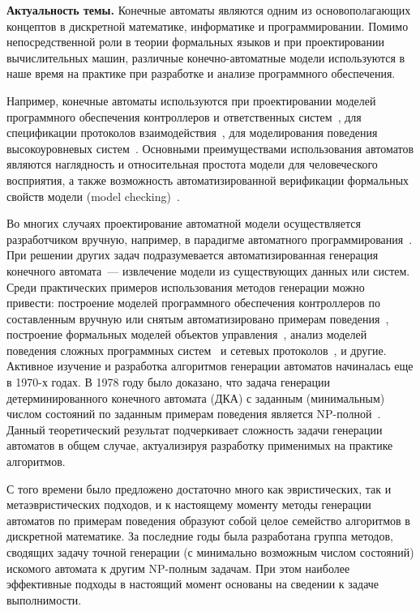 \textbf{Актуальность темы.} 
Конечные автоматы являются одним из основополагающих концептов в дискретной математике, информатике и программировании.
Помимо непосредственной роли в теории формальных языков и при проектировании вычислительных машин, различные конечно-автоматные модели используются в наше время на практике при разработке и анализе программного обеспечения.

Например, конечные автоматы используются при проектировании моделей программного обеспечения контроллеров и ответственных систем~\cite{shalyto-automata-2010,DBLP:conf/setta/PatilDV15}, для спецификации протоколов взаимодействия~\cite{DBLP:conf/coordination/JongmansHA14}, для моделирования поведения высокоуровневых систем~\cite{DBLP:journals/ese/HeuleV13,wagner2006modeling}.
Основными преимуществами использования автоматов являются наглядность и относительная простота модели для человеческого восприятия, а также возможность автоматизированной верификации формальных свойств модели (model checking)~\cite{clarke2018model}.

Во многих случаях проектирование автоматной модели осуществляется разработчиком вручную, например, в парадигме автоматного программирования~\cite{shalyto-automata-2010}.
При решении других задач подразумевается автоматизированная генерация конечного автомата~--- извлечение модели из существующих данных или систем.
Среди практических примеров использования методов генерации можно привести: построение моделей программного обеспечения контроллеров по составленным вручную или снятым автоматизировано примерам поведения~\cite{DBLP:conf/etfa/ChivilikhinBUSS18}, построение формальных моделей объектов управления~\cite{DBLP:conf/etfa/BuzhinskyV17,DBLP:journals/tii/BuzhinskyV17}, анализ моделей поведения сложных программных систем~\cite{DBLP:journals/tosem/CookW98,DBLP:conf/sigsoft/BertolinoIPT09,DBLP:journals/ese/HeuleV13} и сетевых протоколов~\cite{DBLP:conf/sp/SivakornAPKJ17}, и другие.
Активное изучение и разработка алгоритмов генерации автоматов начиналась еще в 1970-х годах.
В 1978 году было доказано, что задача генерации детерминированного конечного автомата (ДКА) с заданным (минимальным) числом состояний по заданным примерам поведения является NP-полной~\cite{DBLP:journals/iandc/Gold78}.
Данный теоретический результат подчеркивает сложность задачи генерации автоматов в общем случае, актуализируя разработку применимых на практике алгоритмов.

С того времени было предложено достаточно много как эвристических, так и метаэвристических подходов, и к настоящему моменту методы генерации автоматов по примерам поведения образуют собой целое семейство алгоритмов в дискретной математике. За последние годы была разработана группа методов, сводящих задачу точной генерации (с минимально возможным числом состояний) искомого автомата к другим NP-полным задачам. При этом наиболее эффективные подходы в настоящий момент основаны на сведении к задаче выполнимости.%

